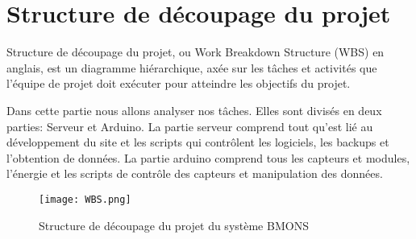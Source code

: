 \section{Structure de découpage du projet}

Structure de découpage du projet, ou Work Breakdown Structure (WBS) en anglais, est un diagramme hiérarchique, axée sur les tâches et activités que l’équipe de projet doit exécuter pour atteindre les objectifs du projet.

Dans cette partie nous allons analyser nos tâches. Elles sont divisés en deux parties: Serveur et Arduino. La partie serveur comprend tout qu'est lié au développement du site et les scripts qui contrôlent les logiciels, les backups et l'obtention de données. La partie arduino comprend tous les capteurs et modules, l'énergie et les scripts de contrôle des capteurs et manipulation des données.  


\begin{figure}[h!]
\centering\texttt{[image: WBS.png]}
\caption{\label{fig:SDP} Structure de découpage du projet du système BMONS}
\end{figure}

\clearpage